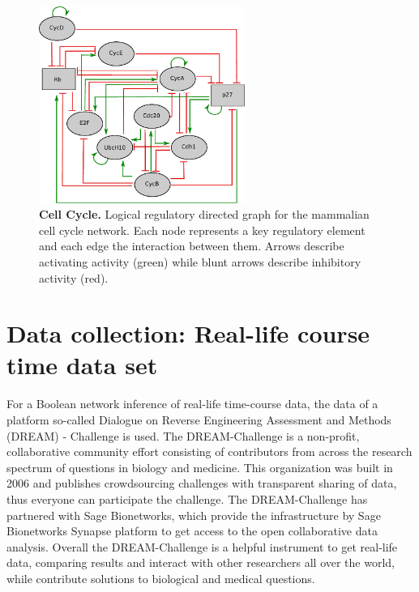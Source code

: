 \begin{figure}[H]
\centering
\includegraphics[width=0.6\textwidth]{./Bilder/cellcycle.pdf}
\caption[Cell cycle]{\textbf{Cell Cycle.} Logical regulatory directed graph for the mammalian cell cycle network. Each node represents a key regulatory element and each edge the interaction between them. Arrows describe activating activity (green) while blunt arrows describe inhibitory activity (red).}
\label{fig:9}
\end{figure}
\newpage
\section{Data collection: Real-life course time data set }

For a Boolean network inference of real-life time-course data, the data of a platform so-called Dialogue on Reverse Engineering Assessment and Methods (\gls{DREAM}) - Challenge is used. The DREAM-Challenge is a non-profit, collaborative community effort consisting of contributors from across the research spectrum of questions in biology and medicine. This organization was built in 2006 and publishes crowdsourcing challenges with transparent sharing of data, thus everyone can participate the challenge. The DREAM-Challenge has partnered with Sage Bionetworks, which provide the infrastructure by Sage Bionetworks Synapse platform to get access to the open collaborative data analysis. Overall the DREAM-Challenge is a helpful instrument to get real-life data, comparing results  and interact with other researchers all over the world, while contribute solutions to biological and medical questions.

